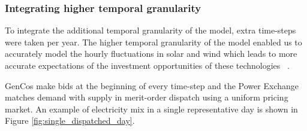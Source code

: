 %
%
%
%
%


\subsubsection{Integrating higher temporal granularity}

To integrate the additional temporal granularity of the model, extra time-steps were taken per year. The higher temporal granularity of the model enabled us to accurately model the hourly fluctuations in solar and wind  which leads to more accurate expectations of the investment opportunities of these technologies ~\cite{Ludig2011,Haydt2011}.

GenCos make bids at the beginning of every time-step and the Power Exchange matches demand with supply in merit-order dispatch using a uniform pricing market. An example of electricity mix in a single representative day is shown in Figure \ref{fig:single_dispatched_day}. 

%

